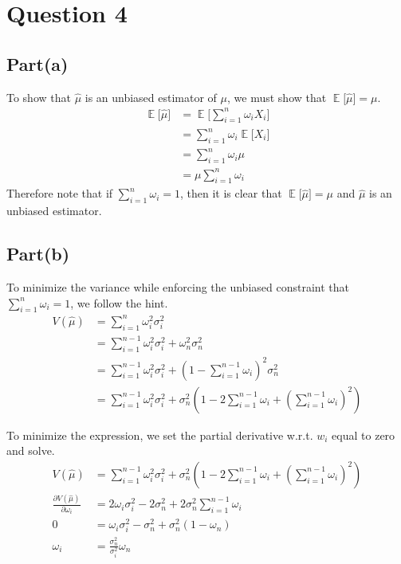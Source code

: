 \documentclass[12pt]{article}
\DeclareMathOperator{\EX}{\mathbb{E}}%
\begin{document}
\section*{Question 4}

\subsection*{Part(a)}

To show that $\widehat{\mu}$ is an unbiased estimator of $\mu$, we must show that $\EX\big[\widehat{\mu}\big] = \mu$. \\
		\begin{align*} 
			\EX\big[\widehat{\mu}\big] &= \EX\big[\sum_{i=1}^{n} \omega_{i} X_{i}\big] \\
														  &= \sum_{i=1}^{n} \omega_{i} \EX\big[X_{i}\big] \\
														  &= \sum_{i=1}^{n} \omega_{i} \mu \\
														  &= \mu \sum_{i=1}^{n} \omega_{i}
		\end{align*}
Therefore note that if $\sum_{i=1}^{n} \omega_{i} = 1$, then it is clear that $\EX\big[\widehat{\mu}\big] = \mu$ and $\widehat{\mu}$ is an unbiased estimator. 

\subsection*{Part(b)}

To minimize the variance while enforcing the unbiased constraint that $\sum_{i=1}^{n} \omega_{i} = 1$, we follow the hint. \\
		\begin{align*} 
			V(\widehat{\mu}) &= \sum_{i=1}^{n} \omega_{i}^2 \sigma_{i}^2 \\
										 &= \sum_{i=1}^{n-1} \omega_{i}^2 \sigma_{i}^2 + \omega_{n}^2 \sigma_{n}^2 \\
										 &= \sum_{i=1}^{n-1} \omega_{i}^2 \sigma_{i}^2 + (1-\sum_{i=1}^{n-1} \omega_{i})^2 \sigma_{n}^2 \\
										 &= \sum_{i=1}^{n-1} \omega_{i}^2 \sigma_{i}^2 + \sigma_{n}^2(1 - 2\sum_{i=1}^{n-1} \omega_{i} + (\sum_{i=1}^{n-1} \omega_{i})^2) 
		\end{align*}
		
To minimize the expression, we set the partial derivative w.r.t. $w_{i}$ equal to zero and solve. 
		\begin{align*} 
			V(\widehat{\mu}) &= \sum_{i=1}^{n-1} \omega_{i}^2 \sigma_{i}^2 + \sigma_{n}^2(1 - 2\sum_{i=1}^{n-1} \omega_{i} + (\sum_{i=1}^{n-1} \omega_{i})^2) \\
			\frac{\partial{V(\widehat{\mu})}}{\partial{\omega_{i}}} &= 2\omega_{i}\sigma_{i}^2 - 2\sigma_{n}^2 + 2\sigma_{n}^2\sum_{i=1}^{n-1}\omega_{i} \\
			0 &= \omega_{i}\sigma_{i}^2 - \sigma_{n}^2 + \sigma_{n}^2(1 - \omega_{n}) \\
			\omega_{i} &= \frac{\sigma_{n}^2}{\sigma_{i}^2} \omega_{n}
		\end{align*}
		
\end{document}
